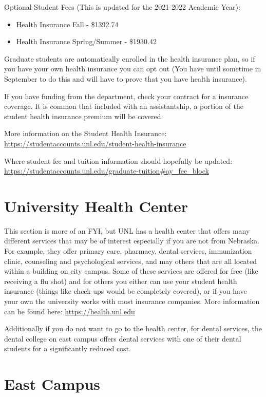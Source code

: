 \documentclass[
  12pt,
]{book}
\providecommand{\tightlist}{%
  \setlength{\itemsep}{0pt}\setlength{\parskip}{0pt}}
\begin{document}
Optional Student Fees (This is updated for the 2021-2022 Academic Year):

\begin{itemize}
\tightlist
\item
  Health Insurance Fall - \$1392.74
\item
  Health Insurance Spring/Summer - \$1930.42
\end{itemize}

Graduate students are automatically enrolled in the health insurance plan, so if you have your own health insurance you can opt out (You have until sometime in September to do this and will have to prove that you have health insurance).

If you have funding from the department, check your contract for a insurance coverage. It is common that included with an assistantship, a portion of the student health insurance premium will be covered.

More information on the Student Health Insurance:
\url{https://studentaccounts.unl.edu/student-health-insurance}

Where student fee and tuition information should hopefully be updated: \url{https://studentaccounts.unl.edu/graduate-tuition\#ay_fee_block}

\hypertarget{university-health-center}{%
\section{University Health Center}\label{university-health-center}}

This section is more of an FYI, but UNL has a health center that offers many different services that may be of interest especially if you are not from Nebraska. For example, they offer primary care, pharmacy, dental services, immunization clinic, counseling and psychological services, and may others that are all located within a building on city campus. Some of these services are offered for free (like receiving a flu shot) and for others you either can use your student health insurance (things like check-ups would be completely covered), or if you have your own the university works with most insurance companies. More information can be found here: \url{https://health.unl.edu}

Additionally if you do not want to go to the health center, for dental services, the dental college on east campus offers dental services with one of their dental students for a significantly reduced cost.

\hypertarget{east-campus}{%
\section{East Campus}\label{east-campus}}
\end{document}
